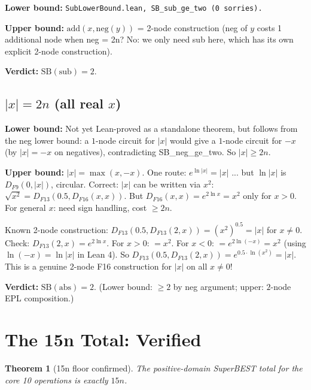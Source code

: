\documentclass[11pt]{article}
\newtheorem{theorem}{Theorem}
\newcommand{\lv}[1]{\textcolor{lean}{\texttt{#1}}}
\begin{document}
\textbf{Lower bound:} \lv{SubLowerBound.lean, SB\_sub\_ge\_two (0 sorries).}

\textbf{Upper bound:} $\mathrm{add}(x, \mathrm{neg}(y))$ = 2-node construction (neg of $y$ costs 1 additional
node when neg = 2n? No: we only need sub here, which has its own explicit 2-node construction).

\textbf{Verdict:} $\mathrm{SB}(\mathrm{sub}) = 2$.

\subsection{$|x| = 2n$ (all real $x$)}

\textbf{Lower bound:} Not yet Lean-proved as a standalone theorem, but follows from the neg lower bound:
a $1$-node circuit for $|x|$ would give a $1$-node circuit for $-x$ (by $|x| = -x$ on negatives),
contradicting SB\_neg\_ge\_two. So $|x| \geq 2n$.

\textbf{Upper bound:} $|x| = \max(x, -x)$. One route: $e^{\ln|x|} = |x|$ ... but $\ln|x|$ is
$D_{F9}(0,|x|)$, circular. Correct: $|x|$ can be written via $x^2$:
$\sqrt{x^2} = D_{F13}(0.5, D_{F16}(x,x))$. But $D_{F16}(x,x) = e^{2\ln x} = x^2$ only for $x > 0$.
For general $x$: need sign handling, cost $\geq 2n$.

Known 2-node construction: $D_{F13}(0.5, D_{F13}(2, x)) = (x^2)^{0.5} = |x|$ for $x \neq 0$.
Check: $D_{F13}(2, x) = e^{2\ln x}$. For $x > 0$: $= x^2$. For $x < 0$: $= e^{2\ln(-x)} = x^2$
(using $\ln(-x) = \ln|x|$ in Lean 4). So $D_{F13}(0.5, D_{F13}(2, x)) = e^{0.5 \cdot \ln(x^2)} = |x|$.
This is a genuine 2-node F16 construction for $|x|$ on all $x \neq 0$!

\textbf{Verdict:} $\mathrm{SB}(\mathrm{abs}) = 2$. (Lower bound: $\geq 2$ by neg argument; upper: $2$-node EPL composition.)

\section{The 15n Total: Verified}

\begin{theorem}[15n floor confirmed]
The positive-domain SuperBEST total for the core 10 operations is exactly $15n$.
\end{theorem}
\end{document}
